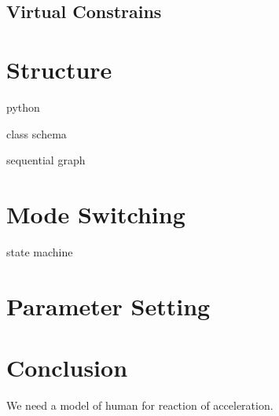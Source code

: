 \subsection{Virtual Constrains}

\section{Structure}

python

class schema

sequential graph

\section{Mode Switching}
state machine

\section{Parameter Setting}


\section{Conclusion}
We need a model of human for reaction of acceleration.